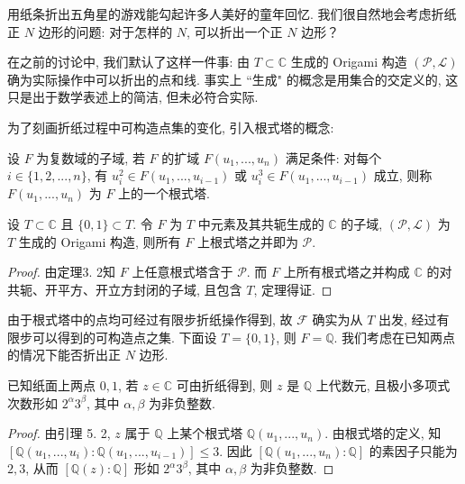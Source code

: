 用纸条折出五角星的游戏能勾起许多人美好的童年回忆. 
我们很自然地会考虑折纸正 $N$ 边形的问题: 对于怎样的 $N$, 可以折出一个正 $N$ 边形？

在之前的讨论中, 我们默认了这样一件事: 
由 $T\subset\mathbb{C}$ 生成的 Origami 构造 
$(\mathcal{P},\mathcal{L})$ 确为实际操作中可以折出的点和线. 
事实上 ``生成" 的概念是用集合的交定义的, 这只是出于数学表述上的简洁, 但未必符合实际. 

为了刻画折纸过程中可构造点集的变化, 引入根式塔的概念: 

\begin{definition}
    设 $F$ 为复数域的子域, 若 $F$ 的扩域 $F(u_1,...,u_n)$ 满足条件: 
    对每个 $i\in\{1,2,...,n\}$, 
    有 $u_i^2\in F(u_1,...,u_{i-1})$ 或 $u_i^3\in F(u_1,...,u_{i-1})$ 成立, 
    则称 $F(u_1,...,u_n)$ 为 $F$ 上的一个根式塔.
\end{definition}

\begin{lemma}
    设 $T\subset\mathbb{C}$ 且 $\{0,1\}\subset T$. 
    令 $F$ 为 $T$ 中元素及其共轭生成的 $\mathbb{C}$ 的子域, 
    $(\mathcal{P},\mathcal{L})$ 为 $T$ 生成的 Origami 构造, 
    则所有 $F$ 上根式塔之并即为 $\mathcal{P}$. 
\end{lemma}

\begin{proof}
    由定理3. 2知 $F$ 上任意根式塔含于 $\mathcal{P}$. 
    而 $F$ 上所有根式塔之并构成 $\mathbb{C}$ 的对共轭、开平方、开立方封闭的子域, 
    且包含 $T$, 定理得证. 
\end{proof}

由于根式塔中的点均可经过有限步折纸操作得到, 
故 $\mathcal{F}$ 确实为从 $T$ 出发, 
经过有限步可以得到的可构造点之集. 
下面设 $T=\{0,1\}$, 则 $F=\mathbb{Q}$. 
我们考虑在已知两点的情况下能否折出正 $N$ 边形. 

\begin{proposition}
    已知纸面上两点 $0,1$, 若 $z\in\mathbb{C}$ 可由折纸得到, 
    则 $z$ 是 $\mathbb{Q}$ 上代数元, 
    且极小多项式次数形如 $2^\alpha 3^\beta$, 其中 $\alpha,\beta$ 为非负整数. 
\end{proposition}

\begin{proof}
    由引理 5. 2,  $z$ 属于 $\mathbb{Q}$ 上某个根式塔 $\mathbb{Q}(u_1,...,u_n)$. 
    由根式塔的定义, 知 $[\mathbb{Q}(u_1,...,u_i):\mathbb{Q}(u_1,...,u_{i-1})]\leq 3$. 
    因此 $[\mathbb{Q}(u_1,...,u_n):\mathbb{Q}]$ 的素因子只能为 $2,3$, 
    从而 $[\mathbb{Q}(z):\mathbb{Q}]$ 形如 $2^\alpha 3^\beta$, 其中 $\alpha,\beta$ 为非负整数.
\end{proof}

